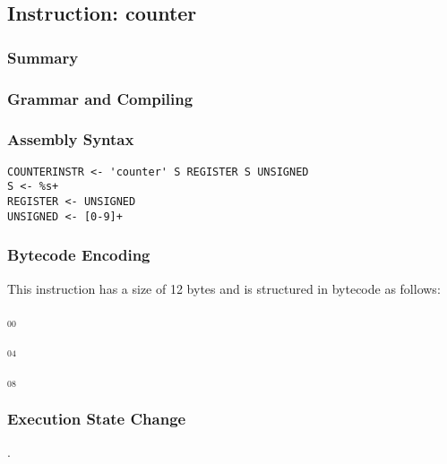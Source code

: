 \subsection{Instruction: counter}

\subsubsection{Summary}


\subsubsection{Grammar and Compiling}


\subsubsection{Assembly Syntax}

\begin{myquote}
\begin{verbatim}
COUNTERINSTR <- 'counter' S REGISTER S UNSIGNED
S <- %s+
REGISTER <- UNSIGNED
UNSIGNED <- [0-9]+
\end{verbatim}
\end{myquote}


\subsubsection{Bytecode Encoding}

This instruction has a size of 12 bytes and is structured in bytecode as follows:

$_{00}$\ 



$_{04}$\ 



$_{08}$\ 
\fbox{%
  \parbox{20pt}{%
00
  }%
}


\subsubsection{Execution State Change}

.


